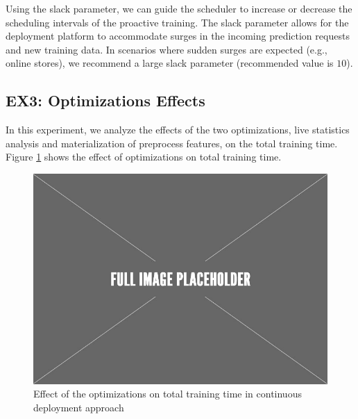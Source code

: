 Using the slack parameter, we can guide the scheduler to increase or decrease the scheduling intervals of the proactive training.
The slack parameter allows for the deployment platform to accommodate surges in the incoming prediction requests and new training data.
In scenarios where sudden surges are expected (e.g., online stores), we recommend a large slack parameter (recommended value is $10$). 

\subsection{EX3: Optimizations Effects}
In this experiment, we analyze the effects of the two optimizations, live statistics analysis and materialization of preprocess features, on the total training time.
Figure \ref{optimization-effect} shows the effect of optimizations on total training time.
\begin{figure}
\centering
\includegraphics[width=\columnwidth]{../images/placeholder.jpeg}
\caption{Effect of the optimizations on total training time in continuous deployment approach}
\label{optimization-effect}
\end{figure}

